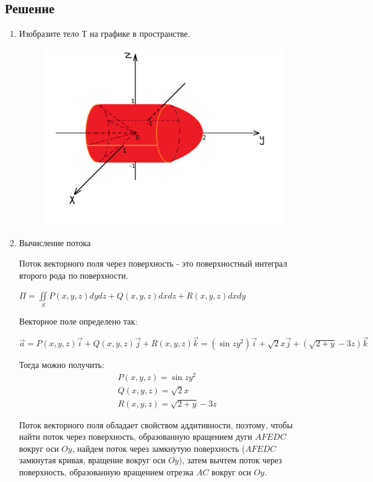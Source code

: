 \subsection{Решение}
\begin{enumerate}
\item Изобразите тело Т на графике в пространстве.

\begin{figure}[!htbp]
  \centering
\includegraphics[scale = 0.5]{images/Math_RW4_task3.png}
\end{figure}

\item Вычисление потока

Поток векторного поля через поверхность - это поверхностный интеграл второго рода по поверхности.

$\Pi = \iint\limits_{S} P(x,y,z)dydz + Q(x,y,z)dxdz + R(x,y,z)dxdy$

Векторное поле определено так:

$\Vec{a} = P(x,y,z)\Vec{i} + Q(x,y,z)\Vec{j} + R(x,y,z)\Vec{k} = (\sin{zy^2})\Vec{i} + \sqrt{2}x\Vec{j} + (\sqrt{2+y}-3z)\Vec{k}$

Тогда можно получить:
\begin{align*}
    &P(x,y,z) = \sin{zy^2}\\
    &Q(x,y,z) = \sqrt{2}x\\
    &R(x,y,z) = \sqrt{2+y}-3z
\end{align*}

Поток векторного поля обладает свойством аддитивности, поэтому, чтобы найти поток через поверхность, образованную вращением дуги $AFEDC$ вокруг оси $Oy$, найдем поток через замкнутую поверхность ($AFEDC$ замкнутая кривая, вращение вокруг оси $Oy$), затем вычтем поток через поверхность, образованную вращением отрезка $AC$ вокруг оси $Oy$.


\end{enumerate}
